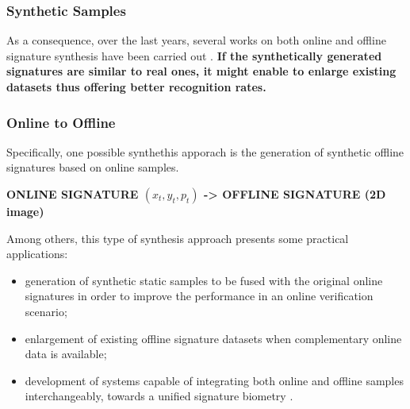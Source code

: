 \documentclass{beamer}
\begin{document}
\begin{frame}
\frametitle{Synthetic Samples}

As a consequence, over the last years, several works on both online and offline signature synthesis have been carried out \parencite{galbally2009synthetic, galbally2012synthetic, ferrer2013synthetic, ferrer2013realistic, diaz2014generation}. 
\vskip 0.5cm
\textbf{If the synthetically generated signatures are similar to real ones, it might enable to enlarge existing datasets thus offering better recognition rates.}



\end{frame}

\begin{frame}
\frametitle{Online to Offline}
Specifically, one possible synthethis apporach is the generation of synthetic offline signatures based on online samples. 

\vskip 0.5cm
\textbf{ONLINE SIGNATURE $(x_t,y_t,p_t)$ -> OFFLINE SIGNATURE (2D image)}
\vskip 0.5cm

Among others, this type of synthesis approach presents some practical applications:
\begin{itemize}
  \item generation of synthetic static samples to be fused with the original online signatures in order to improve the performance in an online verification scenario;
  \item enlargement of existing offline signature datasets when complementary online data is available;
  \item development of systems capable of integrating both online and offline samples interchangeably, towards a unified signature biometry \parencite{chapter}.
\end{itemize}


\end{frame}
\end{document}
